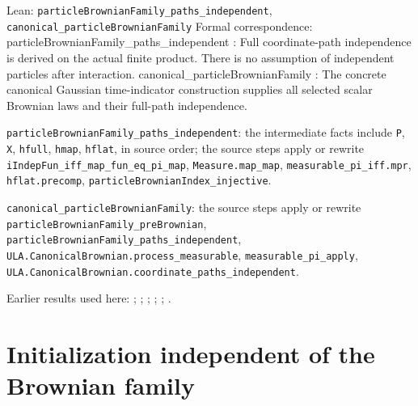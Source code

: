 \documentclass[11pt,a4paper]{report}
\begin{document}
\begin{leanbox}{Lean: \texttt{particleBrownianFamily\_\allowbreak{}paths\_\allowbreak{}independent}, \texttt{canonical\_\allowbreak{}particleBrownianFamily}}
Formal correspondence: particleBrownianFamily\_paths\_independent : Full coordinate-path independence is derived on the actual finite product. There is no assumption of independent particles after interaction. canonical\_particleBrownianFamily : The concrete canonical Gaussian time-indicator construction supplies all selected scalar Brownian laws and their full-path independence.



\texttt{particle\allowbreak{}Brownian\allowbreak{}Family\_\allowbreak{}paths\_\allowbreak{}independent}: the intermediate facts include \texttt{P}, \texttt{X}, \texttt{hfull}, \texttt{hmap}, \texttt{hflat}, in source order; the source steps apply or rewrite \texttt{i\allowbreak{}Indep\allowbreak{}Fun\_\allowbreak{}iff\_\allowbreak{}map\_\allowbreak{}fun\_\allowbreak{}eq\_\allowbreak{}pi\_\allowbreak{}map}, \texttt{Measure.\allowbreak{}map\_\allowbreak{}map}, \texttt{measurable\_\allowbreak{}pi\_\allowbreak{}iff.\allowbreak{}mpr}, \texttt{hflat.\allowbreak{}precomp}, \texttt{particle\allowbreak{}Brownian\allowbreak{}Index\_\allowbreak{}injective}.



\texttt{canonical\_\allowbreak{}particle\allowbreak{}Brownian\allowbreak{}Family}: the source steps apply or rewrite \texttt{particle\allowbreak{}Brownian\allowbreak{}Family\_\allowbreak{}pre\allowbreak{}Brownian}, \texttt{particle\allowbreak{}Brownian\allowbreak{}Family\_\allowbreak{}paths\_\allowbreak{}independent}, \texttt{ULA.\allowbreak{}Canonical\allowbreak{}Brownian.\allowbreak{}process\_\allowbreak{}measurable}, \texttt{measurable\_\allowbreak{}pi\_\allowbreak{}apply}, \texttt{ULA.\allowbreak{}Canonical\allowbreak{}Brownian.\allowbreak{}coordinate\_\allowbreak{}paths\_\allowbreak{}independent}.
\end{leanbox}


Earlier results used here: \cite[Section~3.8.11]{LangevinLean2026ULASC}; \cite[Section~3.8.16]{LangevinLean2026ULASC}; \cite[Section~3.8.17]{LangevinLean2026ULASC}; \cite[Section~3.8.19]{LangevinLean2026ULASC}; \cite[Section~3.8.20]{LangevinLean2026ULASC}; \cite[Section~3.8.21]{LangevinLean2026ULASC}.
\section{\texorpdfstring{Initialization independent of the Brownian family}{Initialization independent of the Brownian family}}
\label{proof-module-ProximalLangevin-MeanFieldInitialSource-lean}
\end{document}
